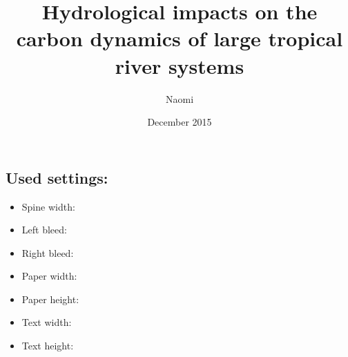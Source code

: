 \documentclass[cam,cover]{adsphd}
\title{Hydrological impacts on the carbon dynamics of large tropical river systems}
\author{Naomi}{Geeraert}
\date{December 2015}
\begin{document}
\makefullcoverpage{\adsphdspinewidth}{}

\newlength{\testje}
\setlength{\testje}{10mm}

\mbox{}
\newpage
\subsection*{Used settings:}
\begin{itemize}
	\item Spine width: \printlength{\adsphdspinewidth}
	\item Left bleed: \printlength{\lbleed}
	\item Right bleed: \printlength{\rbleed}
	\item Paper width: \printlength{\adsphdpaperwidth}
	\item Paper height: \printlength{\adsphdpaperheight}
	\item Text width: \printlength{\textwidth}
	\item Text height: \printlength{\textheight}
\end{itemize}
\end{document}
